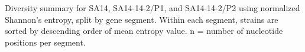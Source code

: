 \documentclass{report}
\begin{document}
\begin{table}[h]
	\centering
	\begin{ThreePartTable}

	\caption[Diversity summary for SA14, SA14-14-2/P1, and SA14-14-2/P2 using normalized Shannon's entropy,
		split by gene segment.]{Diversity summary for SA14, SA14-14-2/P1, and SA14-14-2/P2 using normalized Shannon's entropy,
	split by gene segment. Within each segment, strains are sorted by descending order of mean entropy value. n = number of nucleotide positions
	per segment.}

	\label{my-label}
	
	\begin{tablenotes}
	\item[]
	\end{tablenotes}
	\end{ThreePartTable}
\end{table}
\end{document}
